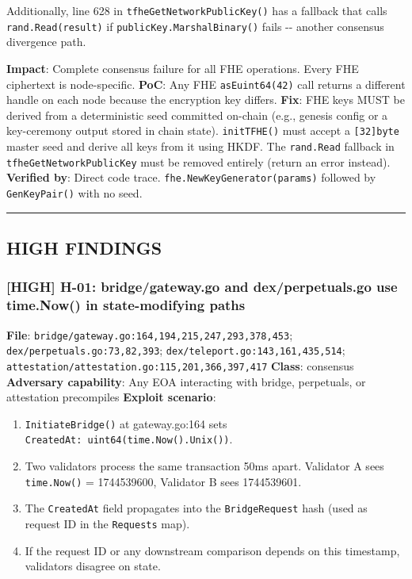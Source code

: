 \documentclass[
]{article}
\providecommand{\tightlist}{%
  \setlength{\itemsep}{0pt}\setlength{\parskip}{0pt}}
\begin{document}
Additionally, line 628 in \texttt{tfheGetNetworkPublicKey()} has a
fallback that calls \texttt{rand.Read(result)} if
\texttt{publicKey.MarshalBinary()} fails -\/- another consensus
divergence path.

\textbf{Impact}: Complete consensus failure for all FHE operations.
Every FHE ciphertext is node-specific. \textbf{PoC}: Any FHE
\texttt{asEuint64(42)} call returns a different handle on each node
because the encryption key differs. \textbf{Fix}: FHE keys MUST be
derived from a deterministic seed committed on-chain (e.g., genesis
config or a key-ceremony output stored in chain state).
\texttt{initTFHE()} must accept a \texttt{{[}32{]}byte} master seed and
derive all keys from it using HKDF. The \texttt{rand.Read} fallback in
\texttt{tfheGetNetworkPublicKey} must be removed entirely (return an
error instead). \textbf{Verified by}: Direct code trace.
\texttt{fhe.NewKeyGenerator(params)} followed by \texttt{GenKeyPair()}
with no seed.

\begin{center}\rule{0.5\linewidth}{0.5pt}\end{center}

\subsection{HIGH FINDINGS}\label{high-findings}

\subsubsection{{[}HIGH{]} H-01: bridge/gateway.go and dex/perpetuals.go
use time.Now() in state-modifying
paths}\label{high-h-01-bridgegatewaygo-and-dexperpetualsgo-use-timenow-in-state-modifying-paths}

\textbf{File}: \texttt{bridge/gateway.go:164,194,215,247,293,378,453};
\texttt{dex/perpetuals.go:73,82,393};
\texttt{dex/teleport.go:143,161,435,514};
\texttt{attestation/attestation.go:115,201,366,397,417} \textbf{Class}:
consensus \textbf{Adversary capability}: Any EOA interacting with
bridge, perpetuals, or attestation precompiles \textbf{Exploit
scenario}:

\begin{enumerate}
\def\labelenumi{\arabic{enumi}.}
\tightlist
\item
  \texttt{InitiateBridge()} at gateway.go:164 sets
  \texttt{CreatedAt:\ uint64(time.Now().Unix())}.
\item
  Two validators process the same transaction 50ms apart. Validator A
  sees \texttt{time.Now()} = 1744539600, Validator B sees 1744539601.
\item
  The \texttt{CreatedAt} field propagates into the
  \texttt{BridgeRequest} hash (used as request ID in the
  \texttt{Requests} map).
\item
  If the request ID or any downstream comparison depends on this
  timestamp, validators disagree on state.
\end{enumerate}
\end{document}
